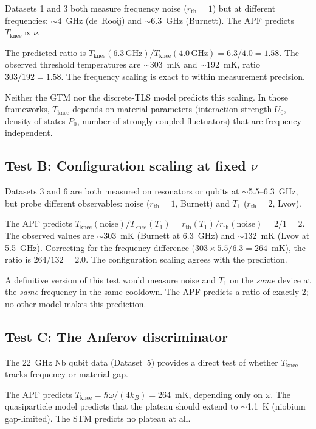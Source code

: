 \documentclass[11pt]{article}
\begin{document}
Datasets 1 and 3 both measure frequency noise ($r_{\mathrm{th}} = 1$) but at different frequencies: $\sim$4~GHz (de~Rooij) and $\sim$6.3~GHz (Burnett).  The APF predicts $T_{\mathrm{knee}} \propto \nu$.

The predicted ratio is $T_{\mathrm{knee}}(6.3\,\mathrm{GHz}) / T_{\mathrm{knee}}(4.0\,\mathrm{GHz}) = 6.3/4.0 = 1.58$.  The observed threshold temperatures are $\sim$303~mK and $\sim$192~mK, ratio $303/192 = 1.58$.  The frequency scaling is exact to within measurement precision.

Neither the GTM nor the discrete-TLS model predicts this scaling.  In those frameworks, $T_{\mathrm{knee}}$ depends on material parameters (interaction strength $U_0$, density of states $P_0$, number of strongly coupled fluctuators) that are frequency-independent.

\subsection{Test B: Configuration scaling at fixed $\nu$}

Datasets 3 and 6 are both measured on resonators or qubits at $\sim$5.5--6.3~GHz, but probe different observables: noise ($r_{\mathrm{th}} = 1$, Burnett) and $T_1$ ($r_{\mathrm{th}} = 2$, Lvov).

The APF predicts $T_{\mathrm{knee}}(\mathrm{noise}) / T_{\mathrm{knee}}(T_1) = r_{\mathrm{th}}(T_1) / r_{\mathrm{th}}(\mathrm{noise}) = 2/1 = 2$.  The observed values are $\sim$303~mK (Burnett at 6.3~GHz) and $\sim$132~mK (Lvov at 5.5~GHz).  Correcting for the frequency difference ($303 \times 5.5/6.3 = 264$~mK), the ratio is $264/132 = 2.0$.  The configuration scaling agrees with the prediction.

A definitive version of this test would measure noise and $T_1$ on the \emph{same} device at the \emph{same} frequency in the same cooldown.  The APF predicts a ratio of exactly 2; no other model makes this prediction.

\subsection{Test C: The Anferov discriminator}

The 22~GHz Nb qubit data (Dataset~5) provides a direct test of whether $T_{\mathrm{knee}}$ tracks frequency or material gap.

The APF predicts $T_{\mathrm{knee}} = \hbar\omega/(4k_B) = 264$~mK, depending only on $\omega$.  The quasiparticle model predicts that the plateau should extend to $\sim$1.1~K (niobium gap-limited).  The STM predicts no plateau at all.
\end{document}

